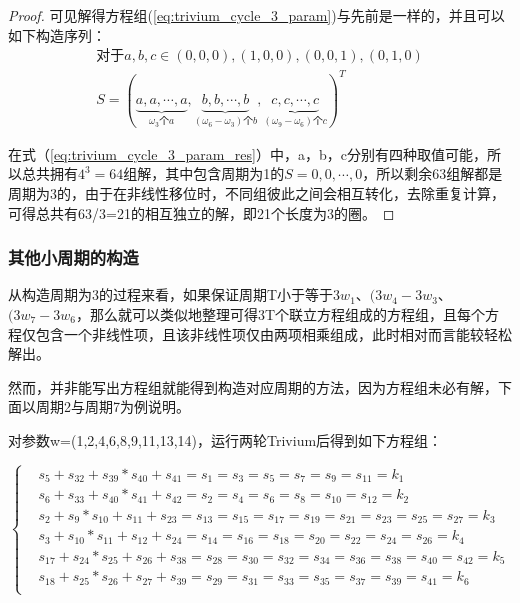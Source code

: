 \begin{thm}
\begin{proof}
可见解得方程组(\ref{eq:trivium_cycle_3_param})与先前是一样的，并且可以如下构造序列：
\begin{align}
\label{eq:trivium_cycle_3_param_res}
\text{对于}a, b, c \in {(0, 0, 0), (1, 0, 0), (0, 0, 1), (0, 1, 0)}\\
S = (\underbrace{a,a,\cdots,a}_{\omega_{3}\text{个}a},\underbrace{b,b,\cdots,b}_{(\omega_{6}-\omega_{3})\text{个}b},\underbrace{c,c,\cdots,c}_{(\omega_{9}-\omega_{6})\text{个}c})^{T}
\end{align}

在式（\ref{eq:trivium_cycle_3_param_res}）中，a，b，c分别有四种取值可能，所以总共拥有$4^{3}=64$组解，其中包含周期为1的$S={0,0,\cdots,0}$，所以剩余63组解都是周期为3的，由于在非线性移位时，不同组彼此之间会相互转化，去除重复计算，可得总共有63/3=21的相互独立的解，即21个长度为3的圈。

\end{proof}
\end{thm}

\subsubsection{其他小周期的构造}

从构造周期为3的过程来看，如果保证周期T小于等于$3w_{1}$、$(3w_{4}-3w_{3}$、$(3w_{7}-3w_{6}$，那么就可以类似地整理可得3T个联立方程组成的方程组，且每个方程仅包含一个非线性项，且该非线性项仅由两项相乘组成，此时相对而言能较轻松解出。

然而，并非能写出方程组就能得到构造对应周期的方法，因为方程组未必有解，下面以周期2与周期7为例说明。

\vspace{3ex}

对参数w=(1,2,4,6,8,9,11,13,14)，运行两轮Trivium后得到如下方程组：

\begin{equation}
\left\{
\begin{aligned}
&s_{5}+s_{32}+s_{39}*s_{40}+s_{41}=s_{1}=s_{3}=s_{5}=s_{7}=s_{9}=s_{11}=k_{1}\\
&s_{6}+s_{33}+s_{40}*s_{41}+s_{42}=s_{2}=s_{4}=s_{6}=s_{8}=s_{10}=s_{12}=k_{2}\\
&s_{2}+s_{9}*s_{10}+s_{11}+s_{23}=s_{13}=s_{15}=s_{17}=s_{19}=s_{21}=s_{23}=s_{25}=s_{27}=k_{3}\\
&s_{3}+s_{10}*s_{11}+s_{12}+s_{24}=s_{14}=s_{16}=s_{18}=s_{20}=s_{22}=s_{24}=s_{26}=k_{4}\\
&s_{17}+s_{24}*s_{25}+s_{26}+s_{38}=s_{28}=s_{30}=s_{32}=s_{34}=s_{36}=s_{38}=s_{40}=s_{42}=k_{5}\\
&s_{18}+s_{25}*s_{26}+s_{27}+s_{39}=s_{29}=s_{31}=s_{33}=s_{35}=s_{37}=s_{39}=s_{41}=k_{6}\\
\end{aligned}
\right.
\end{equation}

